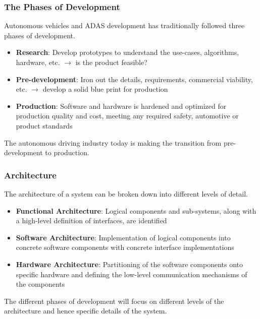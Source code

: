 \documentclass[aspectratio=169]{beamer}
\begin{document}
\begin{frame}
\frametitle{The Phases of Development}
Autonomous vehicles and ADAS development has traditionally followed three phases
of development.

\begin{itemize}
    \item \textbf{Research}: Develop prototypes to understand the use-cases, algorithms,
        hardware, etc. $\rightarrow$ is the product feasible?
    \item \textbf{Pre-development}: Iron out the details, requirements, commercial
        viability, etc. $\rightarrow$ develop a solid blue print for production
    \item \textbf{Production}: Software and hardware is hardened and optimized for
        production quality and cost, meeting any required safety, automotive or
        product standards
\end{itemize}
\pause
\begin{block}{}
The autonomous driving industry today is making the transition from
pre-development to production.
\end{block}
\end{frame}

\begin{frame}
\frametitle{Architecture}
The architecture of a system can be broken down into different levels
of detail.\\
\begin{itemize}
    \item \textbf{Functional Architecture}: Logical components and sub-systems,
        along with a high-level definition of interfaces, are identified
    \item \textbf{Software Architecture}: Implementation of logical components
        into concrete software components with concrete interface
        implementations
    \item \textbf{Hardware Architecture}: Partitioning of the software
        components onto specific hardware and defining the low-level
        communication mechanisms of the components
\end{itemize}
The different phases of development will focus on different levels of
the architecture and hence specific details of the system.
\end{frame}





\end{document}
